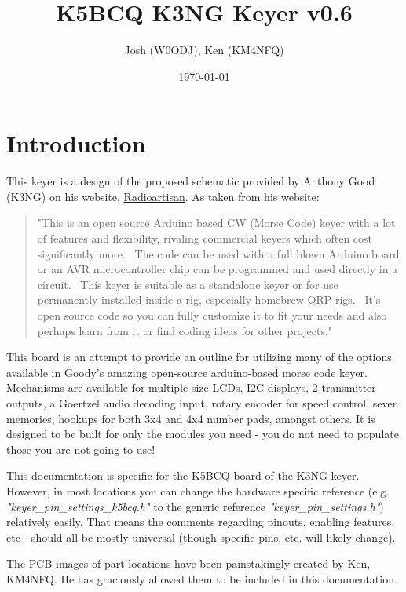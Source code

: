 \documentclass[11pt]{article}
\author{Josh (W0ODJ), Ken (KM4NFQ)}
\date{\today}
\title{K5BCQ K3NG Keyer v0.6}
\begin{document}
\maketitle
\tableofcontents


\section{Introduction}
\label{sec:org8efcbbc}
This keyer is a design of the proposed schematic provided by Anthony Good (K3NG) on his website, \href{https://blog.radioartisan.com/arduino-cw-keyer}{Radioartisan}.  As taken from his website:
\begin{quote}
"This is an open source Arduino based CW (Morse Code) keyer with a lot of features and flexibility, rivaling commercial keyers which often cost significantly more.  The code can be used with a full blown Arduino board or an AVR microcontroller chip can be programmed and used directly in a circuit.  This keyer is suitable as a standalone keyer or for use permanently installed inside a rig, especially homebrew QRP rigs.  It’s open source code so you can fully customize it to fit your needs and also perhaps learn from it or find coding ideas for other projects."
\end{quote}


This board is an attempt to provide an outline for utilizing many of the options available in Goody's amazing open-source arduino-based morse code keyer.  Mechanisms are available for multiple size LCDs, I2C displays, 2 transmitter outputs, a Goertzel audio decoding input, rotary encoder for speed control, seven memories, hookups for both 3x4 and 4x4 number pads, amongst others.  It is designed to be built for only the modules you need - you do not need to populate those you are not going to use!

This documentation is specific for the K5BCQ board of the K3NG keyer.  However, in most locations you can change the hardware specific reference (e.g. \emph{"keyer\_pin\_settings\_k5bcq.h"} to the generic reference \emph{"keyer\_pin\_settings.h"}) relatively easily.  That means the comments regarding pinouts, enabling features, etc - should all be mostly universal (though specific pins, etc. will likely change).

The PCB images of part locations have been painstakingly created by Ken, KM4NFQ.  He has graciously allowed them to be included in this documentation.
\end{document}
